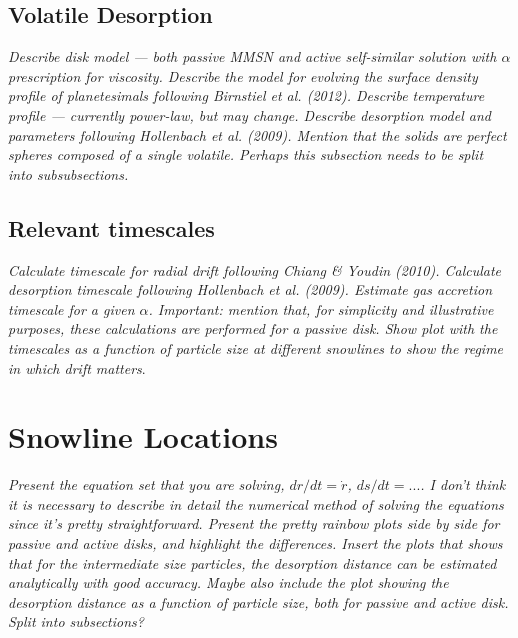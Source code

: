 \documentclass[apj]{emulateapj}
\newcommand{\emgr}[1]{\emph{ \color{gray} #1}}
\begin{document}
\subsection{Volatile Desorption}
\label{sec:desorption}


\emgr{Describe disk model --- both passive MMSN and active self-similar solution with $\alpha$ prescription for viscosity. Describe the model for evolving the surface density profile of planetesimals following Birnstiel et al. (2012). Describe temperature profile --- currently power-law, but may change. Describe desorption model and parameters following Hollenbach et al. (2009). Mention that the solids are perfect spheres composed of a single volatile. Perhaps this subsection needs to be split into subsubsections.}

\subsection{Relevant timescales}

\emgr{Calculate timescale for radial drift following Chiang \& Youdin (2010). Calculate desorption timescale following Hollenbach et al. (2009). Estimate gas accretion timescale for a given $\alpha$. Important: mention that, for simplicity and illustrative purposes, these calculations are performed for a passive disk. Show plot with the timescales as a function of particle size at different snowlines to show the regime in which drift matters}.

\section{Snowline Locations}

\emgr{Present the equation set that you are solving, $dr/dt=\dot{r}$, $ds/dt=...$. I don't think it is necessary to describe in detail the numerical method of solving the equations since it's pretty straightforward. Present the pretty rainbow plots side by side for passive and active disks, and highlight the differences. Insert the plots that shows that for the intermediate size particles, the desorption distance can be estimated analytically with good accuracy. Maybe also include the plot showing the desorption distance as a function of particle size, both for passive and active disk. Split into subsections?}
\end{document}

